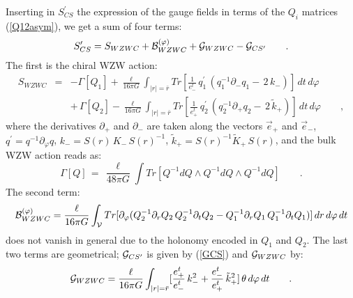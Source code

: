 \documentclass[a4paper,10pt]{article}
\begin{document}
Inserting in $S^\prime _{CS}$ the expression of the gauge fields in terms 
of the $Q_i$ matrices (\ref{Q12asym}), we get a sum of four terms: 
\begin{equation} 
\label{SPCS} 
S^\prime _{CS} =  S_{WZWC} + {\cal B}^{(\varphi)}_{WZWC} + {\cal G}_{WZWC}  
- {\cal G}_{CS'} \qquad . 
\end{equation} 
The first is the chiral WZW action: 
\begin{eqnarray} 
\label{WZWC} 
S_{WZWC} &=& - \Gamma[Q_1] +  \frac {\ell} {16 \pi G} \int_{|r|=\bar r} 
   Tr[ \frac 1 { e_{-}^t} \, q^\prime _1 \, 
 ( q_1^{-1} \partial_{-} q_1 - \, 2\, k_{-} ) ] 
    \, dt \, d\varphi \\ 
  && + \, \Gamma[Q_2] - \frac {\ell} {16 \pi G} \int_{|r|=\bar r} 
   Tr[ \frac 1 { e_{+}^t} \, q^\prime _2 \, 
 ( q_2^{-1} \partial_{+} q_2 - \, 2\, \tilde k_{+} ) ] 
    \, dt \, d\varphi \qquad \nonumber , 
\end{eqnarray} 
where the derivatives $\partial _{+}$ and $\partial _{-}$ are taken along the 
vectors $\vec e_{+}$ and $\vec e_{-}$, $q^\prime=q^{-1} \partial_{\varphi}q$, 
$k_{-}=S(r)\, K_{-}\,S(r)^{-1}$, $\tilde k_{+}=S(r)^{-1}\tilde K_{+}\,S(r)$,  
and the bulk WZW action reads as: 
\begin{equation} 
\Gamma [Q] \, = \, \frac {\ell} { 48 \pi G}  
\int Tr [Q^{-1} dQ \wedge Q^{-1} dQ 
\wedge Q^{-1} dQ] \qquad . 
\end{equation} 
The second term: 
\begin{equation} 
\label{BWZWC} 
{\cal B}^{(\varphi)}_{WZWC} =  \frac {\ell}  {16 \pi G} 
\int_{\cal V} Tr [ \partial_\varphi 
(Q_2^{-1} \partial_r Q_2 \, Q_2^{-1} \partial_t Q_2 
 -Q_1^{-1} \partial_r Q_1 \, Q_1^{-1} \partial_t Q_1)] 
\, dr \, d\varphi\, dt  
\end{equation} 
does not vanish 
in general due to the holonomy encoded in $Q_1$ and $Q_2$. 
The last two terms are geometrical; ${\cal G}_{CS'}$ is given by (\ref{GCS}) 
and ${\cal G}_{WZWC}$ by: 
\begin{equation} 
\label{GWZWC} 
{\cal G}_{WZWC} =  \frac {\ell}  {16 \pi G} 
\int_{|r|=\bar r } 
 [\frac {e_+^t}{e_-^t} \, k_-^2 + \frac {e_-^t}{e_+^t} \, \tilde k_+^2] 
 \, \theta \, d\varphi \, dt \qquad . 
\end{equation} 
 
\end{document}
